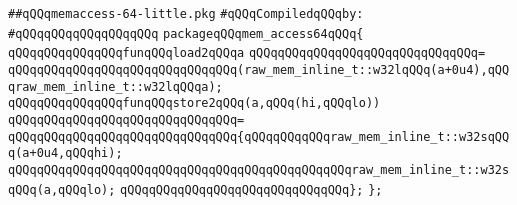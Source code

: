 \label{src/lib/c-glue-lib/ram/memaccess-64-little.pkg}
\verb|##qQQqmemaccess-64-little.pkg|\newline
\newline
\verb|#qQQqCompiledqQQqby:|\newline
\verb|#qQQqqQQqqQQqqQQqqQQq|\newline
\newline
\verb|packageqQQqmem_access64qQQq{|\newline
\newline
\verb|qQQqqQQqqQQqqQQqfunqQQqload2qQQqa|\newline
\verb|qQQqqQQqqQQqqQQqqQQqqQQqqQQqqQQq=|\newline
\verb|qQQqqQQqqQQqqQQqqQQqqQQqqQQqqQQq(raw_mem_inline_t::w32lqQQq(a+0u4),qQQqraw_mem_inline_t::w32lqQQqa);|\newline
\newline
\verb|qQQqqQQqqQQqqQQqfunqQQqstore2qQQq(a,qQQq(hi,qQQqlo))|\newline
\verb|qQQqqQQqqQQqqQQqqQQqqQQqqQQqqQQq=|\newline
\verb|qQQqqQQqqQQqqQQqqQQqqQQqqQQqqQQq{qQQqqQQqqQQqraw_mem_inline_t::w32sqQQq(a+0u4,qQQqhi);|\newline
\verb|qQQqqQQqqQQqqQQqqQQqqQQqqQQqqQQqqQQqqQQqqQQqqQQqraw_mem_inline_t::w32sqQQq(a,qQQqlo);|\newline
\verb|qQQqqQQqqQQqqQQqqQQqqQQqqQQqqQQq};|\newline
\verb|};|\newline

